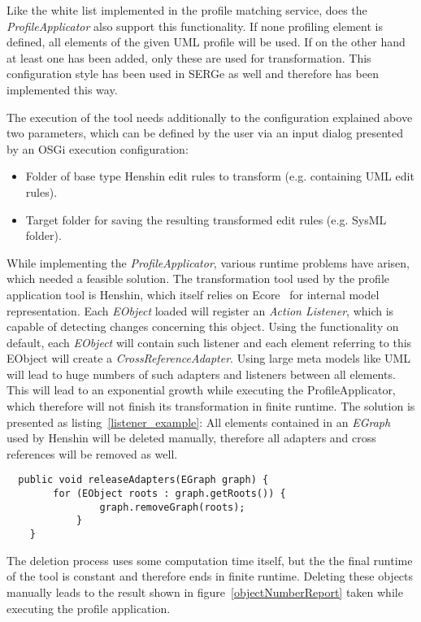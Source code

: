 Like the white list implemented in the profile matching service, does the
\textit{ProfileApplicator} also support this functionality. If none profiling element is defined, all
elements of the given \ac{UML} profile will be used. If on the other hand at
least one has been added, only these are used for transformation. This
configuration style has been used in \ac{SERGe} as well and therefore has been
implemented this way.

The execution of the tool needs additionally to the configuration
explained above two parameters, which can be defined by the user via an input
dialog presented by an OSGi execution configuration:
\begin{itemize}
  \item Folder of base type Henshin edit rules to transform (e.g. containing
  \ac{UML} edit rules).
  \item Target folder for saving the resulting transformed edit rules (e.g.
  \ac{SysML} folder).
\end{itemize}

While implementing the \textit{ProfileApplicator}, various runtime problems have
arisen, which needed a feasible solution. The transformation tool used by the
profile application tool is Henshin, which itself relies on Ecore~\cite{EcoreURL} for
internal model representation. Each \textit{EObject} loaded will register an
\textit{Action Listener}, which is capable of detecting changes concerning this
object.
Using the functionality on default, each \textit{EObject} will contain such listener and
each element referring to this EObject will create a
\textit{CrossReferenceAdapter}. Using large meta models like \ac{UML} will lead
to huge numbers of such adapters and listeners between all elements. This will
lead to an exponential growth while executing the ProfileApplicator, which
therefore will not finish its transformation in finite runtime. The solution is
presented as listing~\ref{listener_example}: All elements contained in an
\textit{EGraph} used by Henshin will be deleted manually, therefore all adapters
and cross references will be removed as well.
\newpage
    \begin{lstlisting}
  public void releaseAdapters(EGraph graph) {		
    	for (EObject roots : graph.getRoots()) {
				graph.removeGraph(roots);
			}
	}\end{lstlisting}
	 
The deletion process uses some computation time itself, but the
the final runtime of the tool is constant and therefore ends
in finite runtime. Deleting these objects manually leads to the result shown in
figure~\ref{objectNumberReport} taken while executing the profile application.

